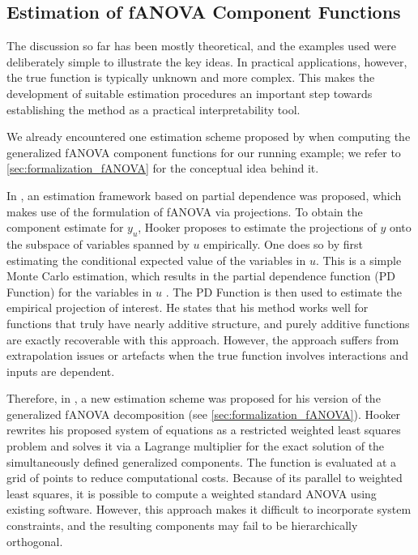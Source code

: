 \subsection{Estimation of fANOVA Component Functions}
The discussion so far has been mostly theoretical, and the examples used were 
deliberately simple to illustrate the key ideas. 
In practical applications, however, the true function is typically unknown and 
more complex. 
This makes the development of suitable estimation procedures an important step 
towards establishing the method as a practical interpretability tool.

We already encountered one estimation scheme proposed by \cite{rahman2014} when computing the generalized fANOVA component functions for our running example; we refer to \autoref{sec:formalization_fANOVA} for the conceptual idea behind it.

In \cite{hooker2004}, an estimation framework based on partial dependence was proposed, which makes use of the formulation of fANOVA via projections. To obtain the component estimate for $y_u$, Hooker proposes to estimate the projections of $y$ onto the subspace of variables spanned by $u$ empirically.
One does so by first estimating the conditional expected value of the variables in $u$. %
This is a simple Monte Carlo estimation, which results in the partial dependence function (PD Function) for the variables in $u$ \citep{hooker2004}.
The PD Function is then used to estimate the empirical projection of interest. He states that his method works well for functions that truly have nearly additive structure, and purely additive functions are exactly recoverable with this approach. However, the approach suffers from extrapolation issues or artefacts when the true function involves interactions and inputs are dependent.\par

Therefore, in \cite{hooker2007}, a new estimation scheme was proposed for his version of the generalized fANOVA decomposition (see \autoref{sec:formalization_fANOVA}).
Hooker rewrites his proposed system of equations as a restricted weighted least squares problem and solves it via a Lagrange multiplier for the exact solution of the simultaneously defined generalized components.
The function is evaluated at a grid of points to reduce computational costs.
Because of its parallel to weighted least squares, it is possible to compute a weighted standard ANOVA using existing software. However, this approach makes it difficult to incorporate system constraints, and the resulting components may fail to be hierarchically orthogonal.\par
